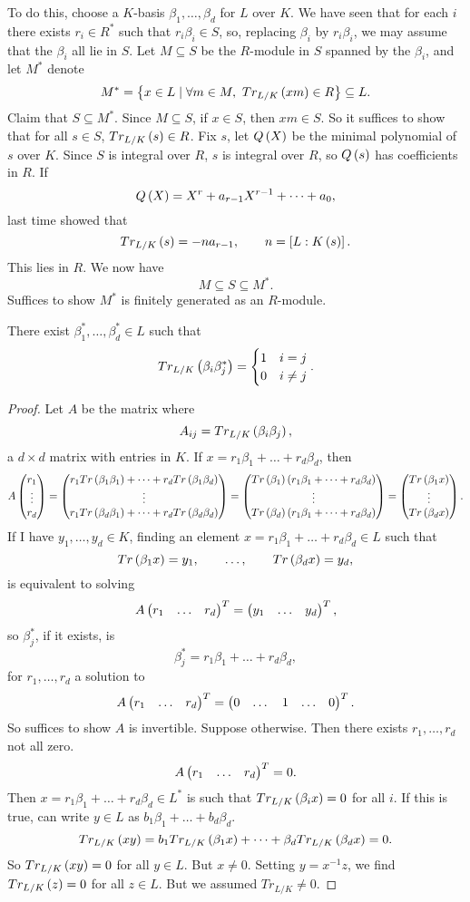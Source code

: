 To do this, choose a $ K $-basis $ \beta_1, \dots, \beta_d $ for $ L $ over $ K $. We have seen that for each $ i $ there exists $ r_i \in R^* $ such that $ r_i\beta_i \in S $, so, replacing $ \beta_i $ by $ r_i\beta_i $, we may assume that the $ \beta_i $ all lie in $ S $. Let $ M \subseteq S $ be the $ R $-module in $ S $ spanned by the $ \beta_i $, and let $ M^* $ denote
$$ M^* = \left\{ x \in L \mid \forall m \in M, \ Tr_{L / K}\left( xm \right) \in R \right\} \subseteq L. $$
Claim that $ S \subseteq M^* $. Since $ M \subseteq S $, if $ x \in S $, then $ xm \in S $. So it suffices to show that for all $ s \in S $, $ Tr_{L / K}\left( s \right) \in R $. Fix $ s $, let $ Q\left( X \right) $ be the minimal polynomial of $ s $ over $ K $. Since $ S $ is integral over $ R $, $ s $ is integral over $ R $, so $ Q\left( s \right) $ has coefficients in $ R $. If
$$ Q\left( X \right) = X^r + a_{r - 1}X^{r - 1} + \dots + a_0, $$
last time showed that
$$ Tr_{L / K}\left( s \right) = -na_{r - 1}, \qquad n = \left[ L : K\left( s \right) \right]. $$
This lies in $ R $. We now have
$$ M \subseteq S \subseteq M^*. $$
Suffices to show $ M^* $ is finitely generated as an $ R $-module.

\begin{proposition}
There exist $ \beta_1^*, \dots, \beta_d^* \in L $ such that
$$ Tr_{L / K}\left( \beta_i\beta_j^* \right) =
\begin{cases}
1 & i = j \\
0 & i \ne j
\end{cases}.
$$
\end{proposition}

\begin{proof}
Let $ A $ be the matrix where
$$ A_{ij} = Tr_{L / K}\left( \beta_i\beta_j \right), $$
a $ d \times d $ matrix with entries in $ K $. If $ x = r_1\beta_1 + \dots + r_d\beta_d $, then
$$ A\begin{pmatrix} r_1 \\ \vdots \\ r_d \end{pmatrix} = \begin{pmatrix} r_1Tr\left( \beta_1\beta_1 \right) + \dots + r_dTr\left( \beta_1\beta_d \right) \\ \vdots \\ r_1Tr\left( \beta_d\beta_1 \right) + \dots + r_dTr\left( \beta_d\beta_d \right) \end{pmatrix} = \begin{pmatrix} Tr\left( \beta_1 \right)\left( r_1\beta_1 + \dots + r_d\beta_d \right) \\ \vdots \\ Tr\left( \beta_d \right)\left( r_1\beta_1 + \dots + r_d\beta_d \right) \end{pmatrix} = \begin{pmatrix} Tr\left( \beta_1x \right) \\ \vdots \\ Tr\left( \beta_dx \right) \end{pmatrix}. $$
If I have $ y_1, \dots, y_d \in K $, finding an element $ x = r_1\beta_1 + \dots + r_d\beta_d \in L $ such that
$$ Tr\left( \beta_1x \right) = y_1, \qquad \dots, \qquad Tr\left( \beta_dx \right) = y_d, $$
is equivalent to solving
$$ A\onebythree{r_1}{\dots}{r_d}^T = \onebythree{y_1}{\dots}{y_d}^T, $$
so $ \beta_j^* $, if it exists, is
$$ \beta_j^* = r_1\beta_1 + \dots + r_d\beta_d, $$
for $ r_1, \dots, r_d $ a solution to
$$ A\onebythree{r_1}{\dots}{r_d}^T = \onebythree{0}{\dots & 1 & \dots}{0}^T. $$
So suffices to show $ A $ is invertible. Suppose otherwise. Then there exists $ r_1, \dots, r_d $ not all zero.
$$ A\onebythree{r_1}{\dots}{r_d}^T = 0. $$
Then $ x = r_1\beta_1 + \dots + r_d\beta_d \in L^* $ is such that $ Tr_{L / K}\left( \beta_ix \right) = 0 $ for all $ i $. If this is true, can write $ y \in L $ as $ b_1\beta_1 + \dots + b_d\beta_d $.
$$ Tr_{L / K}\left( xy \right) = b_1Tr_{L / K}\left( \beta_1x \right) + \dots + \beta_dTr_{L / K}\left( \beta_dx \right) = 0. $$
So $ Tr_{L / K}\left( xy \right) = 0 $ for all $ y \in L $. But $ x \ne 0 $. Setting $ y = x^{-1}z $, we find $ Tr_{L / K}\left( z \right) = 0 $ for all $ z \in L $. But we assumed $ Tr_{L / K} \ne 0 $.
\end{proof}

